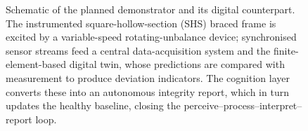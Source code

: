 \begin{figure}[htbp]
{}
\caption{Schematic of the planned demonstrator and its digital counterpart. The instrumented square-hollow-section (SHS) braced frame is excited by a variable-speed rotating-unbalance device; synchronised sensor streams feed a central data-acquisition system and the finite-element-based digital twin, whose predictions are compared with measurement to produce deviation indicators. The cognition layer converts these into an autonomous integrity report, which in turn updates the healthy baseline, closing the perceive--process--interpret--report loop.}
\label{fig:testbed}
\end{figure}
